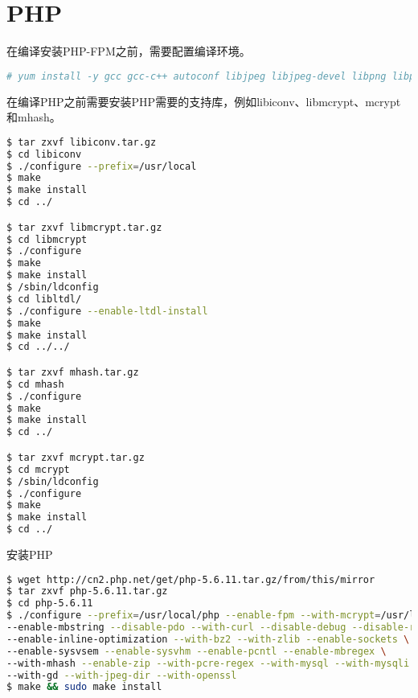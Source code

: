\begin{lstlisting}[language=bash]

\end{lstlisting}


\section{PHP}


在编译安装PHP-FPM之前，需要配置编译环境。

\begin{lstlisting}[language=bash]
# yum install -y gcc gcc-c++ autoconf libjpeg libjpeg-devel libpng libpng-devel freetype freetype-devel libxml2 libxml2-devel zlib zlib-devel glibc glibc-devel glib2 glib2-devel bzip2 bzip2-devel ncurses ncurses-devel curl curl-devel e2fsprogs e2fsprogs-devel krb5 krb5-devel libidn libidn-devel openssl openssl-devel openldap openldap-devel nss_ldap openldap-clients openldap-servers
\end{lstlisting}

在编译PHP之前需要安装PHP需要的支持库，例如libiconv、libmcrypt、mcrypt和mhash。


\begin{lstlisting}[language=bash]
$ tar zxvf libiconv.tar.gz
$ cd libiconv
$ ./configure --prefix=/usr/local
$ make
$ make install
$ cd ../

$ tar zxvf libmcrypt.tar.gz
$ cd libmcrypt
$ ./configure
$ make
$ make install
$ /sbin/ldconfig
$ cd libltdl/
$ ./configure --enable-ltdl-install
$ make
$ make install
$ cd ../../

$ tar zxvf mhash.tar.gz
$ cd mhash
$ ./configure
$ make 
$ make install
$ cd ../

$ tar zxvf mcrypt.tar.gz
$ cd mcrypt
$ /sbin/ldconfig
$ ./configure
$ make
$ make install
$ cd ../
\end{lstlisting}



安装PHP


\begin{lstlisting}[language=bash]
$ wget http://cn2.php.net/get/php-5.6.11.tar.gz/from/this/mirror
$ tar zxvf php-5.6.11.tar.gz
$ cd php-5.6.11
$ ./configure --prefix=/usr/local/php --enable-fpm --with-mcrypt=/usr/local/libmcrypt \
--enable-mbstring --disable-pdo --with-curl --disable-debug --disable-rpath \
--enable-inline-optimization --with-bz2 --with-zlib --enable-sockets \
--enable-sysvsem --enable-sysvhm --enable-pcntl --enable-mbregex \
--with-mhash --enable-zip --with-pcre-regex --with-mysql --with-mysqli \
--with-gd --with-jpeg-dir --with-openssl
$ make && sudo make install
\end{lstlisting}


